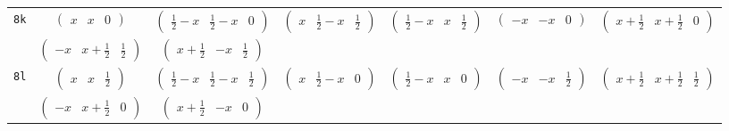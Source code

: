 \documentclass[fleqn,9pt,landscape]{jsarticle}
\begin{document}
\begin{center}
\begin{longtable}{ccccccc}
{\tt 8k} & $ \begin{pmatrix} x & x & 0 \end{pmatrix} $ & $ \begin{pmatrix} \frac{1}{2} - x & \frac{1}{2} - x & 0 \end{pmatrix} $ & $ \begin{pmatrix} x & \frac{1}{2} - x & \frac{1}{2} \end{pmatrix} $ & $ \begin{pmatrix} \frac{1}{2} - x & x & \frac{1}{2} \end{pmatrix} $ & $ \begin{pmatrix} - x & - x & 0 \end{pmatrix} $ & $ \begin{pmatrix} x + \frac{1}{2} & x + \frac{1}{2} & 0 \end{pmatrix} $ \\
& $ \begin{pmatrix} - x & x + \frac{1}{2} & \frac{1}{2} \end{pmatrix} $ & $ \begin{pmatrix} x + \frac{1}{2} & - x & \frac{1}{2} \end{pmatrix} $ & $  $ & $  $ & $  $ & $  $ \\ \hline
{\tt 8l} & $ \begin{pmatrix} x & x & \frac{1}{2} \end{pmatrix} $ & $ \begin{pmatrix} \frac{1}{2} - x & \frac{1}{2} - x & \frac{1}{2} \end{pmatrix} $ & $ \begin{pmatrix} x & \frac{1}{2} - x & 0 \end{pmatrix} $ & $ \begin{pmatrix} \frac{1}{2} - x & x & 0 \end{pmatrix} $ & $ \begin{pmatrix} - x & - x & \frac{1}{2} \end{pmatrix} $ & $ \begin{pmatrix} x + \frac{1}{2} & x + \frac{1}{2} & \frac{1}{2} \end{pmatrix} $ \\
& $ \begin{pmatrix} - x & x + \frac{1}{2} & 0 \end{pmatrix} $ & $ \begin{pmatrix} x + \frac{1}{2} & - x & 0 \end{pmatrix} $ & $  $ & $  $ & $  $ & $  $ \\ \hline

\end{longtable}
\end{center}
\end{document}
